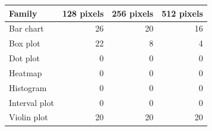\begin{tabular}{lrrr}\toprule
Family & 128 pixels & 256 pixels & 512 pixels\\\midrule
Bar chart & 26 & 20 & 16\\
Box plot & 22 & 8 & 4\\
Dot plot & 0 & 0 & 0\\
Heatmap & 0 & 0 & 0\\
Histogram & 0 & 0 & 0\\
Interval plot & 0 & 0 & 0\\
Violin plot & 20 & 20 & 20\\
\bottomrule\end{tabular}

